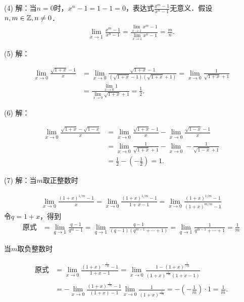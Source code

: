 (4) 解：当$n=0$时，$x^n-1 = 1 - 1 = 0$，表达式$\displaystyle\frac{x^m-1}{x^n-1}$无意义．假设$n , m \in \mathbb{Z}, n \neq 0$．
\begin{align}
    \lim_{x \to 1} \frac{x^m-1}{x^n-1} = \frac{\displaystyle\lim_{x \to 1} x^m-1}{\displaystyle\lim_{x \to 1} x^n-1} = \frac{m}{n}.
\end{align}

(5) 解：

\begin{align}
    \lim_{x \to 0} \frac{\sqrt{1+x}-1}{x} &= \lim_{x \to 0} \frac{\sqrt{1+x} - 1}{(\sqrt{1+x} - 1)(\sqrt{1+x}+1)} = \lim_{x \to 0} \frac{1}{\sqrt{1+x}+1} \\
    &= \frac{\displaystyle\lim_{x \to 0} 1}{\displaystyle\lim_{x \to 0} \sqrt{1+x} + 1} = \frac{1}{2}.
\end{align}

(6) 解：

\begin{align}
    \lim_{x \to 0} \frac{\sqrt{1+x}-\sqrt{1-x}}{x} &= \lim_{x \to 0} \frac{\sqrt{1+x}-1}{x} - \lim_{x \to 0} \frac{\sqrt{1-x}-1}{x} \\
    &= \lim_{x \to 0} \frac{1}{\sqrt{1+x}+1} - \lim_{x \to 0} - \frac{1}{\sqrt{1-x}+1} \\
    &= \frac{1}{2} - (-\frac{1}{2}) = 1.
\end{align}

(7) 解：当$m$取正整数时

\begin{align}
    \lim_{x \to 0} \frac{(1+x)^{1/m}-1}{x} = \lim_{x \to 0} \frac{(1+x)^{1/m}-1}{1+x-1} = \lim_{x \to 0} \frac{(1+x)^{1/m}-1}{(1+x)^{m/m}-1}
\end{align}
令$q = 1+x$，得到
\begin{align}
    \text{原式} &= \lim_{q \to 1} \frac{q-1}{q^m-1} = \lim_{q \to 1} \frac{q-1}{(q-1)(q^{m-1}+\cdots+1)} = \lim_{q \to 1} \frac{1}{q^{m-1}+\cdots+1} = \frac{1}{m}
\end{align}

当$m$取负整数时

\begin{align}
    \text{原式} &= \lim_{x \to 0} \frac{(1+x)^{-\displaystyle\frac{1}{-m}}-1}{1+x-1} = \lim_{x \to 0} \frac{1 - (1+x)^{\displaystyle\frac{1}{-m}}}{(1+x)^{\displaystyle\frac{1}{-m}} (1+x-1)} \\
    &= - \lim_{x \to 0} \frac{(1+x)^{\displaystyle\frac{1}{-m}}-1}{(1+x)-1} \lim_{x \to 0} \frac{1}{(1+x)^{\displaystyle\frac{1}{-m}}} = - \left( - \frac{1}{m} \right) \cdot 1 = \frac{1}{m}.
\end{align}

